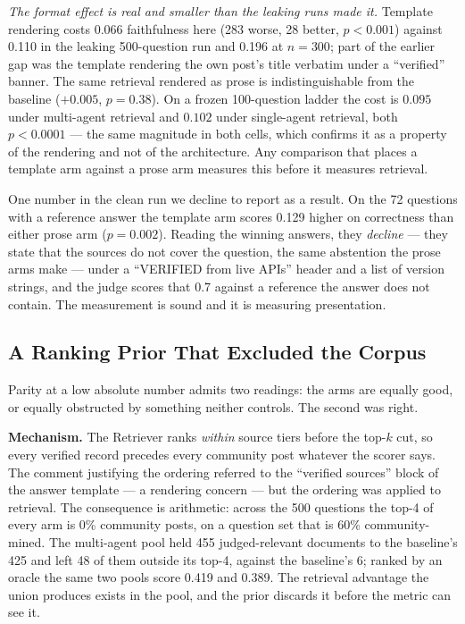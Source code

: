 \documentclass[10pt,conference]{IEEEtran}
\begin{document}
\emph{The format effect is real and smaller than the leaking runs made it.}
Template rendering costs 0.066 faithfulness here (283 worse, 28 better,
$p<0.001$) against 0.110 in the leaking 500-question run and 0.196 at $n=300$;
part of the earlier gap was the template rendering the own post's title verbatim
under a ``verified'' banner. The same retrieval rendered as prose is
indistinguishable from the baseline ($+0.005$, $p=0.38$). On a frozen
100-question ladder the cost is $0.095$ under multi-agent retrieval and $0.102$
under single-agent retrieval, both $p<0.0001$ --- the same magnitude in both
cells, which confirms it as a property of the rendering and not of the
architecture. Any comparison that places a template arm against a prose arm
measures this before it measures retrieval.

One number in the clean run we decline to report as a result. On the 72 questions
with a reference answer the template arm scores 0.129 higher on correctness than
either prose arm ($p=0.002$). Reading the winning answers, they \emph{decline} ---
they state that the sources do not cover the question, the same abstention the
prose arms make --- under a ``VERIFIED from live APIs'' header and a list of
version strings, and the judge scores that 0.7 against a reference the answer does
not contain. The measurement is sound and it is measuring presentation.

\subsection{A Ranking Prior That Excluded the Corpus}\label{sec:tier}

Parity at a low absolute number admits two readings: the arms are equally good,
or equally obstructed by something neither controls. The second was right.

\textbf{Mechanism.} The Retriever ranks \emph{within} source tiers before the
top-$k$ cut, so every verified record precedes every community post whatever the
scorer says. The comment justifying the ordering referred to the ``verified
sources'' block of the answer template --- a rendering concern --- but the
ordering was applied to retrieval. The consequence is arithmetic: across the 500
questions the top-4 of every arm is 0\% community posts, on a question set that
is 60\% community-mined. The multi-agent pool held 455 judged-relevant documents
to the baseline's 425 and left 48 of them outside its top-4, against the
baseline's 6; ranked by an oracle the same two pools score 0.419 and 0.389. The
retrieval advantage the union produces exists in the pool, and the prior
discards it before the metric can see it.
\end{document}
